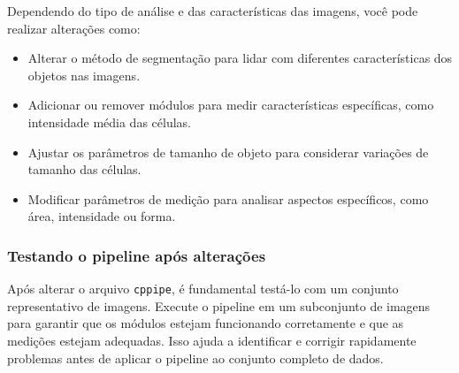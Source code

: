 \documentclass{article}
\begin{document}
Dependendo do tipo de análise e das características das imagens, você pode realizar alterações como:
\begin{itemize}
    \item Alterar o método de segmentação para lidar com diferentes características dos objetos nas imagens.
    \item Adicionar ou remover módulos para medir características específicas, como intensidade média das células.
    \item Ajustar os parâmetros de tamanho de objeto para considerar variações de tamanho das células.
    \item Modificar parâmetros de medição para analisar aspectos específicos, como área, intensidade ou forma.
\end{itemize}

\subsubsection{Testando o pipeline após alterações}

Após alterar o arquivo \texttt{cppipe}, é fundamental testá-lo com um conjunto representativo de imagens. Execute o pipeline em um subconjunto de imagens para garantir que os módulos estejam funcionando corretamente e que as medições estejam adequadas. Isso ajuda a identificar e corrigir rapidamente problemas antes de aplicar o pipeline ao conjunto completo de dados.

\printbibliography
\end{document}
